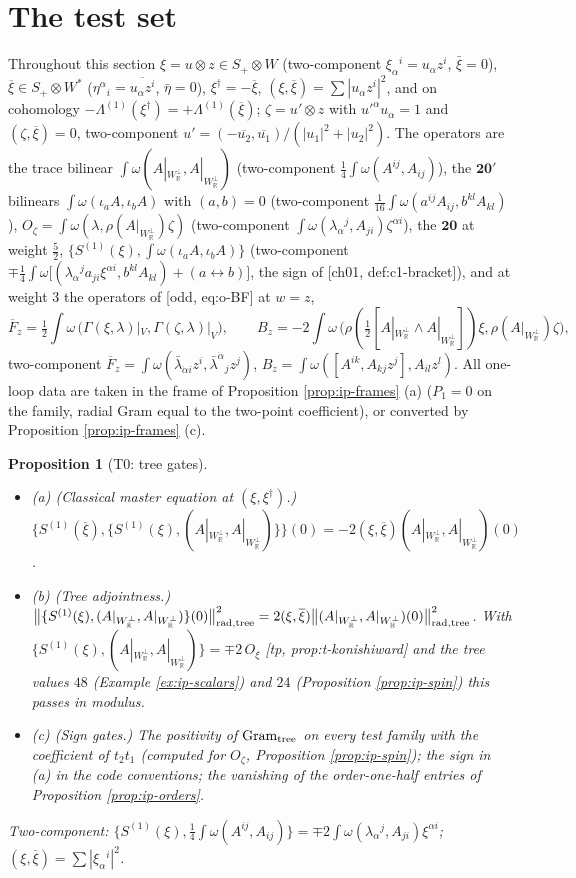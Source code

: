 \documentclass[11pt]{report}
\theoremstyle{plain}
\newtheorem{proposition}[theorem]{Proposition}
\theoremstyle{definition}
\numberwithin{equation}{chapter}
\newcommand{\Wp}{W_{\mathbb R}^\perp}
\newcommand{\Gt}{\mathrm{Gram}_{\rm tree}}
\newcommand{\rad}{{\rm rad}}
\newcommand{\Ko}{(A|_{\Wp},A|_{\Wp})}
\begin{document}
\section{The test set}
\label{sec:ip-tests}

Throughout this section $\xi=u\otimes z\in S_+\otimes W$ (two-component $\xi_\alpha{}^i=u_\alpha z^i$, $\bar\xi=0$), $\overline\xi\in S_+\otimes W^*$ ($\eta^\alpha{}_i=\overline{u_\alpha z^i}$, $\bar\eta=0$), $\xi^\dagger=-\overline\xi$, $(\xi,\overline\xi)=\sum|u_\alpha z^i|^2$, and on cohomology $-\Lambda^{(1)}(\xi^\dagger)=+\Lambda^{(1)}(\overline\xi)$; $\zeta=u'\otimes z$ with $u'^\alpha u_\alpha=1$ and $(\zeta,\overline\xi)=0$, two-component $u'=(-\overline{u_2},\overline{u_1})/(|u_1|^2+|u_2|^2)$. The operators are the trace bilinear $\int\omega\Ko$ (two-component $\tfrac14\int\omega(A^{ij},A_{ij})$), the $\mathbf{20'}$ bilinears $\int\omega(\iota_aA,\iota_bA)$ with $(a,b)=0$ (two-component $\tfrac1{16}\int\omega(a^{ij}A_{ij},b^{kl}A_{kl})$), $O_\zeta=\int\omega(\lambda,\rho(A|_{\Wp})\zeta)$ (two-component $\int\omega(\lambda_\alpha{}^j,A_{ji})\zeta^{\alpha i}$), the $\mathbf{20}$ at weight $\tfrac52$, $\{S^{(1)}(\xi),\int\omega(\iota_aA,\iota_bA)\}$ (two-component $\mp\tfrac14\int\omega\big[(\lambda_\alpha{}^ja_{ji}\xi^{\alpha i},b^{kl}A_{kl})+(a\leftrightarrow b)\big]$, the sign of [ch01, def:c1-bracket]), and at weight $3$ the operators of [odd, eq:o-BF] at $w=z$,
\[
\overline F_z=\tfrac12\int\omega\,\big(\Gamma(\xi,\lambda)|_V,\Gamma(\zeta,\lambda)|_V\big),\qquad B_z=-2\int\omega\,\big(\rho(\tfrac12[A|_{\Wp}\wedge A|_{\Wp}])\xi,\rho(A|_{\Wp})\zeta\big),
\]
two-component $\overline F_z=\int\omega(\bar\lambda_{\dot\alpha i}z^i,\bar\lambda^{\dot\alpha}{}_jz^j)$, $B_z=\int\omega([A^{ik},A_{kj}z^j],A_{il}z^l)$. All one-loop data are taken in the frame of Proposition \ref{prop:ip-frames} (a) ($P_1=0$ on the family, radial Gram equal to the two-point coefficient), or converted by Proposition \ref{prop:ip-frames} (c).

\begin{proposition}[T0: tree gates]
\label{prop:ip-tree}
\begin{itemize}
\item (a) (Classical master equation at $(\xi,\xi^\dagger)$.) $\{S^{(1)}(\overline\xi),\{S^{(1)}(\xi),\Ko\}\}(0)=-2(\xi,\overline\xi)\Ko(0)$.
\item (b) (Tree adjointness.) $\big\|\{S^{(1)}(\xi),\Ko\}(0)\big\|^2_{\rad,{\rm tree}}=2(\xi,\overline\xi)\big\|\Ko(0)\big\|^2_{\rad,{\rm tree}}$. With $\{S^{(1)}(\xi),\Ko\}=\mp2\,O_\xi$ [tp, prop:t-konishiward] and the tree values $48$ (Example \ref{ex:ip-scalars}) and $24$ (Proposition \ref{prop:ip-spin}) this passes in modulus.
\item (c) (Sign gates.) The positivity of $\Gt$ on every test family with the coefficient of $t_2t_1$ (computed for $O_\zeta$, Proposition \ref{prop:ip-spin}); the sign in (a) in the code conventions; the vanishing of the order-one-half entries of Proposition \ref{prop:ip-orders}.
\end{itemize}
Two-component: $\{S^{(1)}(\xi),\tfrac14\int\omega(A^{ij},A_{ij})\}=\mp2\int\omega(\lambda_\alpha{}^j,A_{ji})\xi^{\alpha i}$; $(\xi,\overline\xi)=\sum|\xi_\alpha{}^i|^2$.
\end{proposition}
\end{document}
